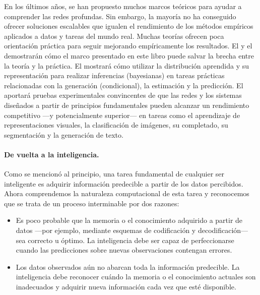 \documentclass[../../book-main_es.tex]{subfiles}
\begin{document}
En los últimos años, se han propuesto muchos marcos teóricos para
ayudar a comprender las redes profundas. Sin embargo, la mayoría no ha conseguido ofrecer
soluciones escalables que igualen el rendimiento de los métodos empíricos aplicados a
datos y tareas del mundo real. Muchas teorías ofrecen poca orientación práctica
para seguir mejorando empíricamente los resultados. El  
y el  demostrarán cómo el marco presentado en este libro puede salvar la
brecha entre la teoría y la práctica. El  mostrará
cómo utilizar la distribución aprendida y su representación para
realizar inferencias (bayesianas) en tareas prácticas relacionadas con
la generación (condicional), la estimación y la predicción. El  
aportará pruebas experimentales convincentes de que las redes y los sistemas diseñados 
a partir de principios fundamentales pueden alcanzar un rendimiento competitivo ---y 
potencialmente superior--- en tareas como el aprendizaje de representaciones visuales, 
la clasificación de imágenes, su completado, su segmentación y la generación de texto.

\paragraph{De vuelta a la inteligencia.}
Como se mencionó al principio, una tarea fundamental de cualquier ser inteligente
es adquirir información predecible a partir de los datos percibidos. Ahora
comprendemos la naturaleza computacional de esta tarea y reconocemos que
se trata de un proceso interminable por dos razones:
\begin{itemize}
    \item Es poco probable que la memoria o el conocimiento adquirido a partir 
        de datos ---por ejemplo, mediante esquemas de codificación y 
        decodificación--- sea correcto u óptimo. La inteligencia
        debe ser capaz de perfeccionarse cuando las predicciones sobre nuevas observaciones
        contengan errores.
    \item Los datos observados aún no abarcan toda la información predecible.
        La inteligencia debe reconocer cuándo la memoria o el conocimiento actuales son
           inadecuados y adquirir nueva información cada vez que esté disponible.
\end{itemize}
\end{document}
